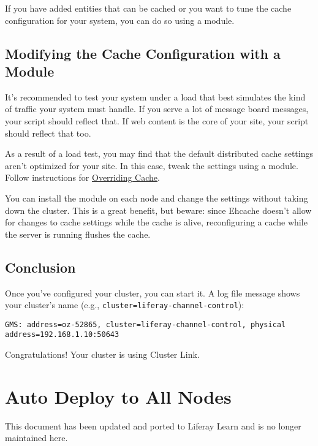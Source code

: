 If you have added entities that can be cached or you want to tune the
cache configuration for your system, you can do so using a module.

\section{Modifying the Cache Configuration with a
Module}\label{modifying-the-cache-configuration-with-a-module}

It's recommended to test your system under a load that best simulates
the kind of traffic your system must handle. If you serve a lot of
message board messages, your script should reflect that. If web content
is the core of your site, your script should reflect that too.

As a result of a load test, you may find that the default distributed
cache settings aren't optimized for your site. In this case, tweak the
settings using a module. Follow instructions for
\href{/docs/7-2/frameworks/-/knowledge_base/f/overriding-cache}{Overriding
Cache}.

You can install the module on each node and change the settings without
taking down the cluster. This is a great benefit, but beware: since
Ehcache doesn't allow for changes to cache settings while the cache is
alive, reconfiguring a cache while the server is running flushes the
cache.

\section{Conclusion}\label{conclusion}

Once you've configured your cluster, you can start it. A log file
message shows your cluster's name (e.g.,
\texttt{cluster=liferay-channel-control}):

\begin{verbatim}
GMS: address=oz-52865, cluster=liferay-channel-control, physical address=192.168.1.10:50643
\end{verbatim}

Congratulations! Your cluster is using Cluster Link.

\chapter{Auto Deploy to All Nodes}\label{auto-deploy-to-all-nodes}

{This document has been updated and ported to Liferay Learn and is no
longer maintained here.}

